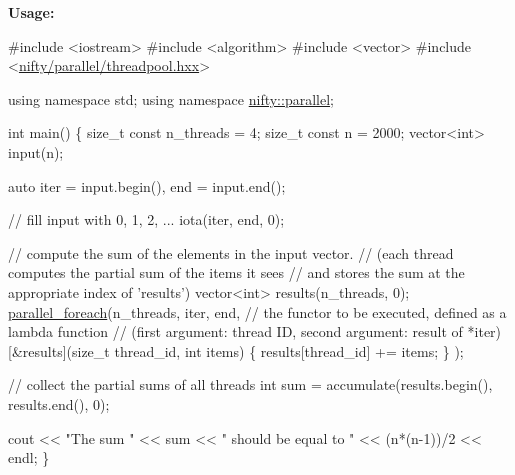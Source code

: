 {\bfseries Usage\+:}


\begin{DoxyCode}
\textcolor{preprocessor}{#include <iostream>}
\textcolor{preprocessor}{#include <algorithm>}
\textcolor{preprocessor}{#include <vector>}
\textcolor{preprocessor}{#include <\hyperlink{threadpool_8hxx}{nifty/parallel/threadpool.hxx}>}

\textcolor{keyword}{using namespace }std;
\textcolor{keyword}{using namespace }\hyperlink{namespacenifty_1_1parallel}{nifty::parallel};

\textcolor{keywordtype}{int} main()
\{
    \textcolor{keywordtype}{size\_t} \textcolor{keyword}{const} n\_threads = 4;
    \textcolor{keywordtype}{size\_t} \textcolor{keyword}{const} n = 2000;
    vector<int> input(n);

    \textcolor{keyword}{auto} iter = input.begin(),
         end  = input.end();

    \textcolor{comment}{// fill input with 0, 1, 2, ...}
    iota(iter, end, 0);

    \textcolor{comment}{// compute the sum of the elements in the input vector.}
    \textcolor{comment}{// (each thread computes the partial sum of the items it sees}
    \textcolor{comment}{//  and stores the sum at the appropriate index of 'results')}
    vector<int> results(n\_threads, 0);
    \hyperlink{group__ParallelProcessing_ga505ac3d12ecde87341bce7b6f1027c88}{parallel\_foreach}(n\_threads, iter, end,
        \textcolor{comment}{// the functor to be executed, defined as a lambda function}
        \textcolor{comment}{// (first argument: thread ID, second argument: result of *iter)}
        [&results](\textcolor{keywordtype}{size\_t} thread\_id, \textcolor{keywordtype}{int} items)
        \{
            results[thread\_id] += items;
        \}
    );

    \textcolor{comment}{// collect the partial sums of all threads}
    \textcolor{keywordtype}{int} sum = accumulate(results.begin(), results.end(), 0);

    cout << \textcolor{stringliteral}{"The sum "} << sum << \textcolor{stringliteral}{" should be equal to "} << (n*(n-1))/2 << endl;
\}
\end{DoxyCode}
 \hypertarget{group__ParallelProcessing_gae081bc77f03a070b9fe0f97966949f58}{}
